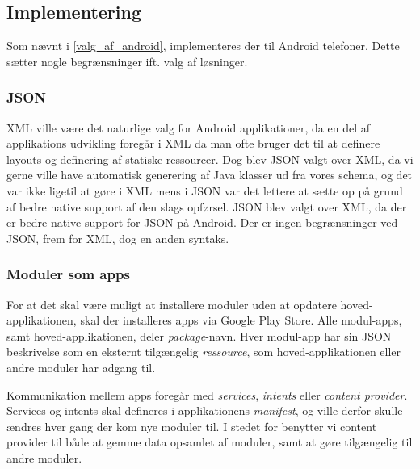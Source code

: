 \subsection{Implementering}
Som nævnt i \cref{valg_af_android}, implementeres der til Android telefoner.
Dette sætter nogle begrænsninger ift. valg af løsninger.

\subsubsection{JSON}
XML ville være det naturlige valg for Android applikationer, da en del af applikations udvikling foregår i XML da man ofte bruger det til at definere layouts og definering af statiske ressourcer. 
Dog blev JSON valgt over XML, da vi gerne ville have automatisk generering af Java klasser ud fra vores schema, og det var ikke ligetil at gøre i XML mens i JSON var det lettere at sætte op på grund af bedre native support af den slags opførsel.
JSON blev valgt over XML, da der er bedre native support for JSON på Android. 
Der er ingen begrænsninger ved JSON, frem for XML, dog en anden syntaks.

\subsubsection{Moduler som apps}
For at det skal være muligt at installere moduler uden at opdatere hoved-applikationen, skal der installeres apps via Google Play Store.
Alle modul-apps, samt hoved-applikationen, deler \textit{package}-navn.
Hver modul-app har sin JSON beskrivelse som en eksternt tilgængelig \textit{ressource}, som hoved-applikationen eller andre moduler har adgang til.

Kommunikation mellem apps foregår med \textit{services}, \textit{intents} eller \textit{content provider}.
Services og intents skal defineres i applikationens \textit{manifest}, og ville derfor skulle ændres hver gang der kom nye moduler til.
I stedet for benytter vi content provider til både at gemme data opsamlet af moduler, samt at gøre tilgængelig til andre moduler.

